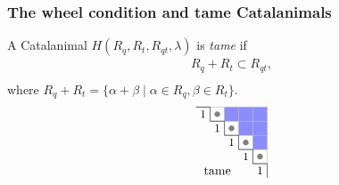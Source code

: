 \documentclass[dvipsnames]{beamer}
\DeclareMathOperator{\GL}{GL}
\theoremstyle{definition}
\newcommand{\qtrootcolor}{blue!45}
\begin{document}
\begin{frame}
  \frametitle{The wheel condition and tame Catalanimals}

A Catalanimal $H(R_{q},R_{t},R_{qt},\lambda )$ is \emph{tame} if
\vspace{-2mm}
\begin{align*}
R_{q}+R_{t}  \subset R_{qt}, \\[-8mm]
\end{align*}
where $R_{q}+R_{t} = \{\alpha+\beta \mid \alpha \in R_q, \beta \in R_t\}$.
\begin{align*}
\begin{tikzpicture}[scale = .4]
\draw[draw = none, fill = \qtrootcolor] (3,-1) rectangle (4,-2);
 \draw[draw = none, fill = \qtrootcolor] (4,-1) rectangle (5,-2);
 \draw[draw = none, fill = \qtrootcolor] (4,-2) rectangle (5,-3);
 \draw[draw = none, fill = \qtrootcolor] (5,-1) rectangle (6,-2);
 \draw[draw = none, fill = \qtrootcolor] (5,-2) rectangle (6,-3);
 \draw[draw = none, fill = \qtrootcolor] (5,-3) rectangle (6,-4);
 \draw[draw = none, fill = gray!100] (2+0.5, -1-0.5) circle (.2);
\draw[draw = none, fill = gray!100] (3+0.5, -2-0.5) circle (.2);
\draw[draw = none, fill = gray!100] (4+0.5, -3-0.5) circle (.2);
\draw[draw = none, fill = gray!100] (5+0.5, -4-0.5) circle (.2);
\draw[thin, black!31] (1,-1) -- (6,-1);
\draw[thin, black!31] (2,-1) -- (2,-1);
\draw[thin, black!31] (2,-2) -- (6,-2);
\draw[thin, black!31] (3,-2) -- (3,-1);
\draw[thin, black!31] (3,-3) -- (6,-3);
\draw[thin, black!31] (4,-3) -- (4,-1);
\draw[thin, black!31] (4,-4) -- (6,-4);
\draw[thin, black!31] (5,-4) -- (5,-1);
\draw[thin, black!31] (5,-5) -- (6,-5);
\draw[thin, black!31] (6,-5) -- (6,-1);
\draw[thin] (1,-1) -- (2,-1);
\draw[thin] (2,-1) -- (2,-2);
\draw[thin] (2,-2) -- (3,-2);
\draw[thin] (3,-2) -- (3,-3);
\draw[thin] (3,-3) -- (4,-3);
\draw[thin] (4,-3) -- (4,-4);
\draw[thin] (4,-4) -- (5,-4);
\draw[thin] (5,-4) -- (5,-5);
\draw[thin] (5,-5) -- (6,-5);
\draw[thin] (6,-5) -- (6,-6);
\node at (3/2,-3/2) {\small $1 $};
\node at (5/2,-5/2) {\small $1 $};
\node at (7/2,-7/2) {\small $1 $};
\node at (9/2,-9/2) {\small $1 $};
\node at (11/2,-11/2) {\small $1 $};
\node at (5/2,-11/2) { tame};
\end{tikzpicture}

\end{align*}
\end{frame}
\end{document}
